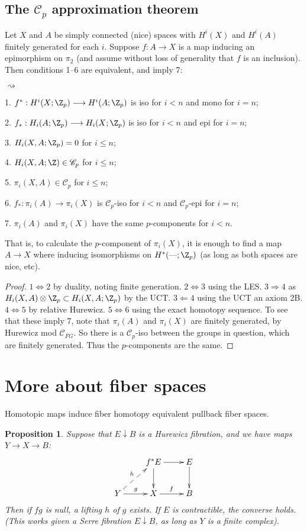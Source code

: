 \documentclass[11pt]{article}
\newcommand{\DASH}{\textup{---}}
\theoremstyle{plain}
\newtheorem*{prop*}{Proposition}
\theoremstyle{definition}
\renewcommand{\to}{\longrightarrow}
\newcommand{\SerreClass}{\mathscr{C}}
\newenvironment{itemise}{
\begin{list}{\textup{$\rightsquigarrow$}}
   {
      \setlength{\topsep}{.1cm}
      \setlength{\itemsep}{1pt}
      \setlength{\parskip}{0pt}
      \setlength{\parsep}{0pt}
   }
}{\end{list}\vspace{-.2cm}}
\begin{document}
\setcounter{subsection}{5}
\subsection{The \texorpdfstring{$\SerreClass_p$}{Cp} approximation theorem}
Let $X$ and $A$ be simply connected (nice) spaces with $H^i(X)$ and $H^i(A)$ finitely generated for each $i$. Suppose $f:A\to X$ is a map inducing an epimorphism on $\pi_2$ (and assume without loss of generality that $f$ is an inclusion). Then conditions 1--6 are equivalent, and imply 7:
\begin{itemise}
\item[1.] $f^*:H^i(X;\Z_p)\to H^i(A;\Z_p)$ is iso for $i<n$ and mono for $i=n$;
\item[2.] $f_*:H_i(A;\Z_p)\to H_i(X;\Z_p)$ is iso for $i<n$ and epi for $i=n$;
\item[3.] $H_i(X,A;\Z_p)=0$ for $i\leq n$;
\item[4.] $H_i(X,A;\Z)\in\SerreClass_p$ for $i\leq n$;
\item[5.] $\pi_i(X,A)\in\SerreClass_p$ for $i\leq n$;
\item[6.] $f_*:\pi_i(A)\to \pi_i(X)$ is $\SerreClass_p$-iso for $i<n$ and $\SerreClass_p$-epi for $i=n$;
\item[7.] $\pi_i(A)$ and $\pi_i(X)$ have the same $p$-components for $i<n$.
\end{itemise}
That is, to calculate the $p$-component of $\pi_i(X)$, it is enough to find a map $A\to X$ where inducing isomorphisms on $H^*(\DASH;\Z_p)$ (as long as both spaces are nice, etc).
\begin{proof}
$1\Leftrightarrow 2$ by duality, noting finite generation. $2\Leftrightarrow 3$ using the LES. $3\Rightarrow 4$ as $H_i(X,A)\otimes\Z_p\subset H_i(X,A;\Z_p)$ by the UCT. $3\Leftarrow 4$ using the UCT an axiom 2B. $4\Leftrightarrow 5$ by relative Hurewicz. $5\Leftrightarrow 6$ using the exact homotopy sequence. To see that these imply 7, note that $\pi_i(A)$ and $\pi_i(X)$ are finitely generated, by Hurewicz mod $\SerreClass_{FG}$. So there is a $\SerreClass_p$-iso between the groups in question, which are finitely generated. Thus the $p$-components are the same.
\end{proof}

\section{More about fiber spaces}
Homotopic maps induce fiber homotopy equivalent pullback fiber spaces.
\begin{prop*}
Suppose that $E\downarrow B$ is a Hurewicz fibration, and we have maps $Y\to X\to B$:
\[\xymatrix{
&f^*E\ar[r]\ar[d]&E\ar[d]\\
Y\ar[r]^g\ar@{-->}[ur]^h&X\ar[r]^f&B
}\]
Then if $fg$ is null, a lifting $h$ of $g$ exists. If $E$ is contractible, the converse holds. (This works given a Serre fibration $E\downarrow B$, as long as $Y$ is a finite complex).
\end{prop*}
\end{document}
